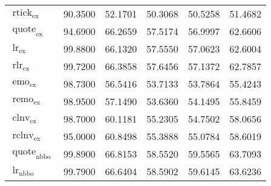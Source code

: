 \begin{table}[H]
\begin{tabular}{@{}p{5.7cm}SSSSS@{}}
        $\operatorname{rtick}_{\mathrm{ex}}$                                                                                  & 90.3500           & 52.1701                            & 50.3068           & 50.5258           & 51.4682           \\
        $\operatorname{quote}_{\mathrm{ex}}$                                                                                  & 94.6900           & 66.2659                            & 57.5174           & 56.9997           & 62.6606           \\
        $\operatorname{lr}_{\mathrm{ex}}$                                                                                     & 99.8800           & 66.1320                            & 57.5550           & 57.0623           & 62.6004           \\
        $\operatorname{rlr}_{\mathrm{ex}}$                                                                                    & 99.7200           & 66.3858                            & 57.6456           & 57.1372           & 62.7857           \\
        $\operatorname{emo}_{\mathrm{ex}}$                                                                                    & 98.7300           & 56.5416                            & 53.7133           & 53.7864           & 55.4243           \\
        $\operatorname{remo}_{\mathrm{ex}}$                                                                                   & 98.9500           & 57.1490                            & 53.6360           & 54.1495           & 55.8459           \\
        $\operatorname{clnv}_{\mathrm{ex}}$                                                                                   & 98.7000           & 60.1181                            & 55.2305           & 54.7502           & 58.0656           \\
        $\operatorname{rclnv}_{\mathrm{ex}}$                                                                                  & 95.0000           & 60.8498                            & 55.3888           & 55.0784           & 58.6019           \\ \midrule
        $\operatorname{quote}_{\mathrm{nbbo}}$                                                                                & 99.8900           & 66.8153                            & 58.5520           & 59.5565           & 63.7093           \\
        $\operatorname{lr}_{\mathrm{nbbo}}$                                                                                   & 99.7900           & 66.6404                            & 58.5902           & 59.6145           & 63.6236           \\

\end{tabular}
\end{table}
